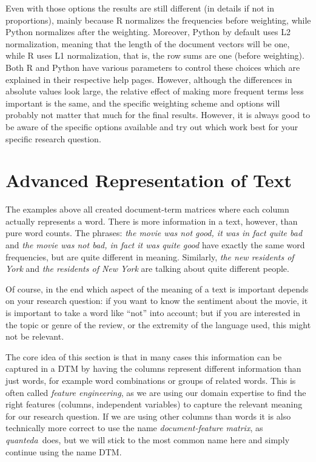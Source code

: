 Even with those options the results are still different (in details if not in proportions),
mainly because R normalizes the frequencies before weighting, while Python normalizes after the weighting.
Moreover, Python by default uses L2 normalization, meaning that the length of the document vectors will be one,
while R uses L1 normalization, that is, the row sums are one (before weighting).
Both R and Python have various parameters to control these choices which are explained in their respective help pages.
However, although the differences in absolute values look large, the relative effect of making more frequent terms less important is the same,
and the specific weighting scheme and options will probably not matter that much for the final results.
However, it is always good to be aware of the specific options available and try out which work best for your specific research question.




%

\section{Advanced Representation of Text}
\label{sec:ngram}

The examples above all created document-term matrices where each column actually represents a word.
There is more information in a text, however, than pure word counts.
The phrases: \emph{the movie was not good, it was in fact quite bad} and \emph{the movie was not bad, in fact it was quite good}
have exactly the same word frequencies, but are quite different in meaning.
Similarly, \emph{the new residents of York} and \emph{the residents of New York} are talking about quite different people.

Of course, in the end which aspect of the meaning of a text is important depends on your research question:
if you want to know the sentiment about the movie, it is important to take a word like ``not'' into account;
but if you are interested in the topic or genre of the review, or the extremity of the language used, this might not be relevant.

The core idea of this section is that in many cases this information can be captured in a DTM by having the columns represent different information than just words, for example word combinations or groups of related words.
This is often called \emph{feature engineering}, as we are using our domain expertise to find the right features (columns, independent variables) to capture the relevant meaning for our research question.
If we are using other columns than words it is also technically more correct to use the name \emph{document-feature matrix}, as \emph{quanteda}\ does, but we will stick to the most common name here and simply continue using the name DTM.

